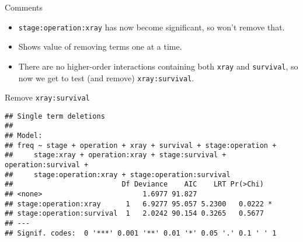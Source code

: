 \begin{frame}[fragile]{Comments}
  
  \begin{itemize}
  \item \texttt{stage:operation:xray} has now become significant, so
    won't remove that.
  \item Shows value of removing terms one at a time.
  \item There are no higher-order interactions containing both
    \texttt{xray} and \texttt{survival}, so now we get to test (and
    remove) \texttt{xray:survival}.
  \end{itemize}
  
\end{frame}

\begin{frame}[fragile]{Remove \texttt{xray:survival}}
  
{\small  
\begin{knitrout}
\color{fgcolor}\begin{kframe}
\begin{alltt}
\hlkwb{=}\hlopt{~}\hlopt{-}\hlopt{:}
\hlstd{=}\hlstd{)}
\end{alltt}
\begin{verbatim}
## Single term deletions
## 
## Model:
## freq ~ stage + operation + xray + survival + stage:operation + 
##     stage:xray + operation:xray + stage:survival + operation:survival + 
##     stage:operation:xray + stage:operation:survival
##                          Df Deviance    AIC    LRT Pr(>Chi)  
## <none>                        1.6977 91.827                  
## stage:operation:xray      1   6.9277 95.057 5.2300   0.0222 *
## stage:operation:survival  1   2.0242 90.154 0.3265   0.5677  
## ---
## Signif. codes:  0 '***' 0.001 '**' 0.01 '*' 0.05 '.' 0.1 ' ' 1
\end{verbatim}
\end{kframe}
\end{knitrout}
}
  
  
\end{frame}

